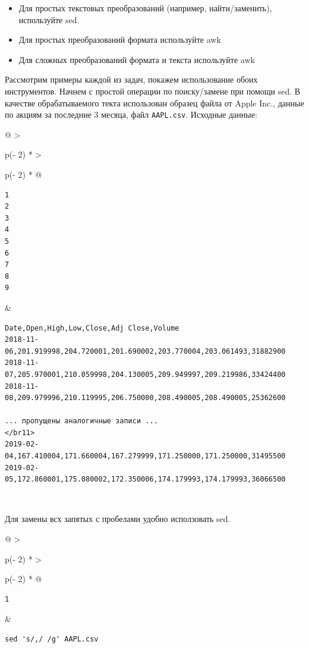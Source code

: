\documentclass{article}
\begin{document}
\begin{itemize}
\tightlist
\item
  Для простых текстовых преобразований (например, найти/заменить),
  используйте sed.
\item
  Для простых преобразований формата используйте awk
\item
  Для сложных преобразований формата и текста используйте awk
\end{itemize}

Рассмотрим примеры каждой из задач, покажем использование обоих
инструментов. Начнем с простой операции по поиску/замене при помощи sed.
В качестве обрабатываемого текта использован образец файла от Apple
Inc., данные по акциям за последние 3 месяца, файл \texttt{AAPL.csv}.
Исходные данные:

\begin{longtable}[]{@{}
  >{\raggedright\arraybackslash}p{(\columnwidth - 2\tabcolsep) * }
  >{\raggedright\arraybackslash}p{(\columnwidth - 2\tabcolsep) * }@{}}
\toprule
\endhead
\begin{minipage}[t]{\linewidth}\raggedright
\begin{verbatim}
1
2
3
4
5
6
7
8
9
\end{verbatim}
\end{minipage} & \begin{minipage}[t]{\linewidth}\raggedright
\begin{verbatim}
Date,Open,High,Low,Close,Adj Close,Volume
2018-11-06,201.919998,204.720001,201.690002,203.770004,203.061493,31882900
2018-11-07,205.970001,210.059998,204.130005,209.949997,209.219986,33424400
2018-11-08,209.979996,210.119995,206.750000,208.490005,208.490005,25362600

... пропущены аналогичные записи ...
</br11>
2019-02-04,167.410004,171.660004,167.279999,171.250000,171.250000,31495500
2019-02-05,172.860001,175.080002,172.350006,174.179993,174.179993,36066500
\end{verbatim}
\end{minipage} \\ \addlinespace
\bottomrule
\end{longtable}

Для замены всх запятых с пробелами удобно исползовать sed.

\begin{longtable}[]{@{}
  >{\raggedright\arraybackslash}p{(\columnwidth - 2\tabcolsep) * }
  >{\raggedright\arraybackslash}p{(\columnwidth - 2\tabcolsep) * }@{}}
\toprule
\endhead
\begin{minipage}[t]{\linewidth}\raggedright
\begin{verbatim}
1
\end{verbatim}
\end{minipage} & \begin{minipage}[t]{\linewidth}\raggedright
\begin{verbatim}
sed 's/,/ /g' AAPL.csv
\end{verbatim}
\end{minipage} \\ \addlinespace
\bottomrule
\end{longtable}
\end{document}
